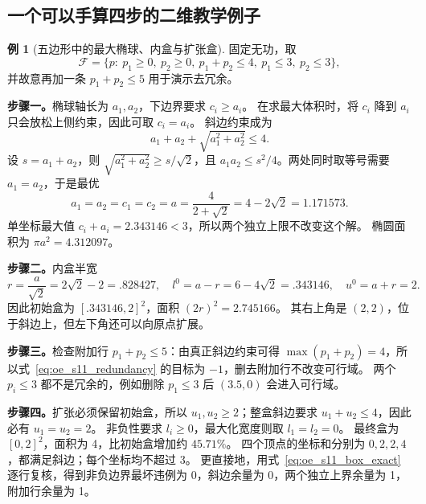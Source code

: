 \documentclass[UTF8,11pt,fontset=fandol,openany,oneside]{ctexbook}
\theoremstyle{definition}
\newtheorem{example}[theorem]{例}
\theoremstyle{remark}
\numberwithin{equation}{chapter}
\begin{document}
\subsection{一个可以手算四步的二维教学例子}

\begin{example}[五边形中的最大椭球、内盒与扩张盒]
固定无功，取
\begin{equation}
 \mathcal F=\{p:\ p_1\ge0,\ p_2\ge0,\ p_1+p_2\le4,\ p_1\le3,\ p_2\le3\},
 \label{eq:oe_s11_polygon}
\end{equation}
并故意再加一条 $p_1+p_2\le5$ 用于演示去冗余。

\textbf{步骤一。}椭球轴长为 $a_1,a_2$，下边界要求 $c_i\ge a_i$。
在求最大体积时，将 $c_i$ 降到 $a_i$ 只会放松上侧约束，因此可取 $c_i=a_i$。
斜边约束成为
\[
 a_1+a_2+\sqrt{a_1^2+a_2^2}\le4.
\]
设 $s=a_1+a_2$，则 $\sqrt{a_1^2+a_2^2}\ge s/\sqrt2$，且
$a_1a_2\le s^2/4$。两处同时取等号需要 $a_1=a_2$，于是最优
\[
 a_1=a_2=c_1=c_2=a=\frac4{2+\sqrt2}=4-2\sqrt2=1.171573.
\]
单坐标最大值 $c_i+a_i=2.343146<3$，所以两个独立上限不改变这个解。
椭圆面积为 $\pi a^2=4.312097$。

\textbf{步骤二。}内盒半宽
\[
 r=\frac a{\sqrt2}=2\sqrt2-2=.828427,
 \quad l^0=a-r=6-4\sqrt2=.343146,
 \quad u^0=a+r=2.
\]
因此初始盒为 $[.343146,2]^2$，面积 $(2r)^2=2.745166$。
其右上角是 $(2,2)$，位于斜边上，但左下角还可以向原点扩展。

\textbf{步骤三。}检查附加行 $p_1+p_2\le5$：由真正斜边约束可得
$\max(p_1+p_2)=4$，所以式~\eqref{eq:oe_s11_redundancy} 的目标为 $-1$，删去附加行不改变可行域。
两个 $p_i\le3$ 都不是冗余的，例如删除 $p_1\le3$ 后 $(3.5,0)$ 会进入可行域。

\textbf{步骤四。}扩张必须保留初始盒，所以 $u_1,u_2\ge2$；整盒斜边要求 $u_1+u_2\le4$，因此必有 $u_1=u_2=2$。
非负性要求 $l_i\ge0$，最大化宽度则取 $l_1=l_2=0$。
最终盒为 $[0,2]^2$，面积为 4，比初始盒增加约 $45.71\%$。
四个顶点的坐标和分别为 $0,2,2,4$，都满足斜边；每个坐标均不超过 3。
更直接地，用式~\eqref{eq:oe_s11_box_exact} 逐行复核，得到非负边界最坏违例为 0，斜边余量为 0，两个独立上界余量为 1，附加行余量为 1。
\end{example}
\end{document}
